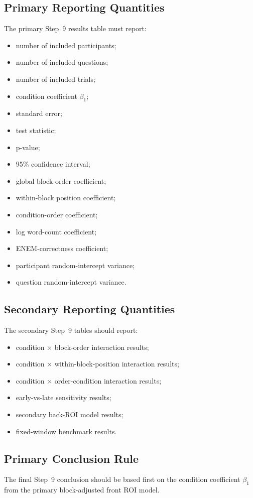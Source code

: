 \subsection{Primary Reporting Quantities}
The primary Step~9 results table must report:
\begin{itemize}
    \item number of included participants;
    \item number of included questions;
    \item number of included trials;
    \item condition coefficient \(\beta_1\);
    \item standard error;
    \item test statistic;
    \item p-value;
    \item 95\% confidence interval;
    \item global block-order coefficient;
    \item within-block position coefficient;
    \item condition-order coefficient;
    \item log word-count coefficient;
    \item ENEM-correctness coefficient;
    \item participant random-intercept variance;
    \item question random-intercept variance.
\end{itemize}

\subsection{Secondary Reporting Quantities}
The secondary Step~9 tables should report:
\begin{itemize}
    \item condition \(\times\) block-order interaction results;
    \item condition \(\times\) within-block-position interaction results;
    \item condition \(\times\) order-condition interaction results;
    \item early-vs-late sensitivity results;
    \item secondary back-ROI model results;
    \item fixed-window benchmark results.
\end{itemize}

\subsection{Primary Conclusion Rule}
The final Step~9 conclusion should be based first on the condition coefficient \(\beta_1\)
from the primary block-adjusted front ROI model.

